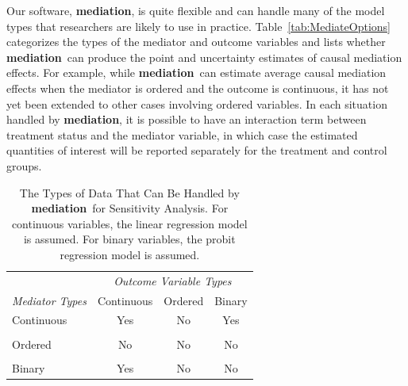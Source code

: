 \documentclass[11pt,letterpaper]{article}
\theoremstyle{plain}
\newcommand\bmediation{{\bf mediation}}
\begin{document}
Our software, \bmediation, is quite flexible and can handle many of
the model types that researchers are likely to use in practice.
Table~\ref{tab:MediateOptions} categorizes the types of the mediator
and outcome variables and lists whether \bmediation\ can produce the
point and uncertainty estimates of causal mediation effects. For
example, while \bmediation\ can estimate average causal mediation
effects when the mediator is ordered and the outcome is continuous, it
has not yet been extended to other cases involving ordered variables.
In each situation handled by \bmediation, it is possible to have an
interaction term between treatment status and the mediator variable,
in which case the estimated quantities of interest will be reported
separately for the treatment and control groups.

\begin{table}[t]
  \begin{center}
\begin{tabular}{lccc}
\hline
                     &\multicolumn{3}{c}{\it Outcome Variable Types} \\
\cline{2-4}
{\it Mediator Types} & Continuous & Ordered & Binary \\ 
\hline
Continuous           & Yes        & No      & Yes \\
                     &            &         &  \\
Ordered              & No         & No      & No  \\
                     &            &         &  \\
Binary               & Yes        & No      & No \\
\hline
\end{tabular}
\caption{The Types of Data That Can Be Handled by \bmediation\ for
  Sensitivity Analysis.  For continuous variables, the linear
  regression model is assumed.  For binary variables, the probit
  regression model is assumed.} \label{tab:SensitivityOptions}
  \end{center}
\end{table}
\end{document}
